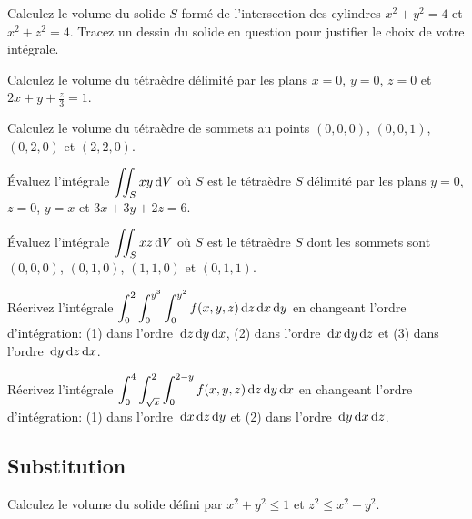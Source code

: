 \begin{question}
Calculez le volume du solide $S$ formé de l'intersection des cylindres
$x^2+y^2=4$ et $x^2+z^2=4$.
Tracez un dessin du solide en question pour justifier le choix de
votre intégrale.
\label{16Q11}
\end{question}

\begin{question}
Calculez le volume du tétraèdre délimité par les plans $x=0$, $y=0$, $z=0$
et $\displaystyle 2x+y+ \frac{z}{3}=1$.
\label{16Q12}
\end{question}

\begin{question}
Calculez le volume du tétraèdre de sommets au points $(0,0,0)$,
$(0,0,1)$, $(0,2,0)$ et $(2,2,0)$.
\label{16Q13}
\end{question}

\begin{question}
Évaluez l'intégrale $\displaystyle \iint_S xy \,\mathrm{d}V$ où $S$ est le tétraèdre
$S$ délimité par les plans $y=0$, $z=0$, $y=x$ et
$\displaystyle 3x+ 3y+ 2z=6$.
\label{16Q14}
\end{question}

\begin{question}
Évaluez l'intégrale $\displaystyle \iint_S xz \,\mathrm{d}V$ où $S$ est le tétraèdre
$S$ dont les sommets sont $(0,0,0)$, $(0,1,0)$, $(1,1,0)$ et $(0,1,1)$.
\label{16Q15}
\end{question}

\begin{question}
Récrivez l'intégrale
$\displaystyle \int_0^2 \int_0^{y^3} \int_0^{y^2} f(x,y,z) \,\mathrm{d}z\,\mathrm{d}x\,\mathrm{d}y$
en changeant l'ordre d'intégration: (1) dans l'ordre $\,\mathrm{d}z\,\mathrm{d}y\,\mathrm{d}x$,
(2) dans l'ordre $\,\mathrm{d}x\,\mathrm{d}y\,\mathrm{d}z$ et (3)  dans l'ordre
$\,\mathrm{d}y\,\mathrm{d}z\,\mathrm{d}x$. 
\label{16Q16}
\end{question}

\begin{question}
Récrivez l'intégrale
$\displaystyle \int_{0}^{4} \int_{\sqrt{x}}^{2} \int_{0}^{2-y}
f(x,y,z) \,\mathrm{d}z\,\mathrm{d}y\,\mathrm{d}x$ en changeant l'ordre d'intégration: (1)
dans l'ordre $\,\mathrm{d}x\,\mathrm{d}z\,\mathrm{d}y$ et (2) dans l'ordre
$\,\mathrm{d}y\,\mathrm{d}x\,\mathrm{d}z$.
\label{16Q17}
\end{question}

\subsection{Substitution}

\begin{question}
Calculez le volume du solide défini par $x^2 + y^2 \leq 1$ et
$z^2 \leq x^2 + y^2$.
\label{16Q18}
\end{question}

